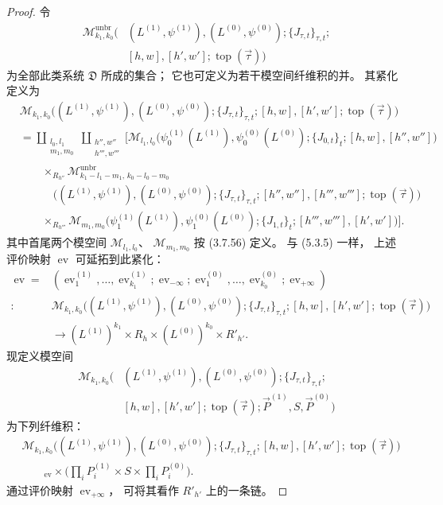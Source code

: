 \begin{proof}
令
\[
\begin{aligned}
\mathcal M^{\mathrm{unbr}}_{k_1,k_0}
\bigl(
 &(L^{(1)},\psi^{(1)}),
 (L^{(0)},\psi^{(0)});
 \{J_{\tau,t}\}_{\tau,t};
\\[-1mm]
 &[h,w],[h',w'];\operatorname{top}(\vec\tau)
\bigr)
\end{aligned}
\]
为全部此类系统 $\mathfrak D$
所成的集合；
它也可定义为若干模空间纤维积的并。
其紧化定义为
\[
\begin{aligned}
&\mathcal M_{k_1,k_0}
\bigl((L^{(1)},\psi^{(1)}),
(L^{(0)},\psi^{(0)});
\{J_{\tau,t}\}_{\tau,t};
[h,w],[h',w'];\operatorname{top}(\vec\tau)\bigr)
\\
&=
\coprod_{\substack{l_0,l_1\\m_1,m_0}}
\coprod_{\substack{h'',w''\\h''',w'''}}
\biggl[
\mathcal M_{l_1,l_0}
\bigl(\psi^{(1)}_0(L^{(1)}),
\psi^{(0)}_0(L^{(0)});
\{J_{0,t}\}_t;
[h,w],[h'',w'']\bigr)
\\[-1mm]
&\qquad\times_{R_{h''}}
\mathcal M^{\mathrm{unbr}}_{
k_1-l_1-m_1,\,
k_0-l_0-m_0}
\\[-1mm]
&\qquad\quad
\bigl((L^{(1)},\psi^{(1)}),
(L^{(0)},\psi^{(0)});
\{J_{\tau,t}\}_{\tau,t};
[h'',w''],[h''',w'''];
\operatorname{top}(\vec\tau)\bigr)
\\[-1mm]
&\qquad\times_{R_{h'''}}
\mathcal M_{m_1,m_0}
\bigl(\psi^{(1)}_1(L^{(1)}),
\psi^{(0)}_1(L^{(0)});
\{J_{1,t}\}_t;
[h''',w'''],[h',w']\bigr)
\biggr].
\end{aligned}
\]
其中首尾两个模空间
$\mathcal M_{l_1,l_0}$、
$\mathcal M_{m_1,m_0}$
按 (3.7.56) 定义。
与 (5.3.5) 一样，
上述评价映射 $\operatorname{ev}$
可延拓到此紧化：
\[
\begin{aligned}
\operatorname{ev}
=&
(\operatorname{ev}^{(1)}_1,\ldots,
\operatorname{ev}^{(1)}_{k_1};
\operatorname{ev}_{-\infty};
\operatorname{ev}^{(0)}_1,\ldots,
\operatorname{ev}^{(0)}_{k_0};
\operatorname{ev}_{+\infty})
\\
\colon&
\mathcal M_{k_1,k_0}
\bigl((L^{(1)},\psi^{(1)}),
(L^{(0)},\psi^{(0)});
\{J_{\tau,t}\}_{\tau,t};
[h,w],[h',w'];\operatorname{top}(\vec\tau)\bigr)
\\
&\longrightarrow
(L^{(1)})^{k_1}\times R_h
\times(L^{(0)})^{k_0}\times R'_{h'}.
\end{aligned}
\]
现定义模空间
\begin{equation}
\begin{aligned}
\mathcal M_{k_1,k_0}
\bigl(
 &(L^{(1)},\psi^{(1)}),
 (L^{(0)},\psi^{(0)});
 \{J_{\tau,t}\}_{\tau,t};
\\[-1mm]
 &[h,w],[h',w'];\operatorname{top}(\vec\tau);
 \vec P^{(1)},S,\vec P^{(0)}
\bigr)
\end{aligned}
\tag{5.3.24}\label{eq:5-3-24}
\end{equation}
为下列纤维积：
\[
\begin{aligned}
&\mathcal M_{k_1,k_0}
\bigl((L^{(1)},\psi^{(1)}),
(L^{(0)},\psi^{(0)});
\{J_{\tau,t}\}_{\tau,t};
[h,w],[h',w'];\operatorname{top}(\vec\tau)\bigr)
\\
&\qquad{}_{\operatorname{ev}}\!\times
\biggl(
\prod_i P_i^{(1)}
\times S\times\prod_iP_i^{(0)}
\biggr).
\end{aligned}
\]
通过评价映射
$\operatorname{ev}_{+\infty}$，
可将其看作 $R'_{h'}$ 上的一条链。


\end{proof}
